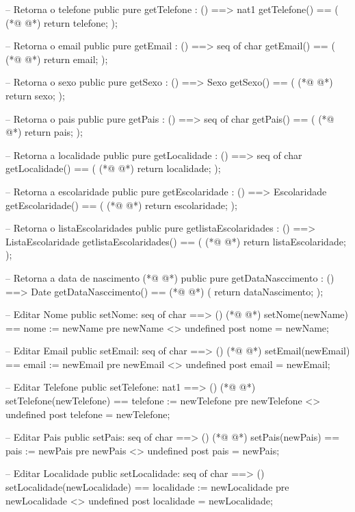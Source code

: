 \begin{vdmpp}[breaklines=true]
 -- Retorna o telefone
 public pure getTelefone : () ==> nat1
 getTelefone() ==
 (
(*@
\label{getEmail:151}
@*)
  return telefone;
 );
 
 -- Retorna o email
 public pure getEmail : () ==> seq of char
 getEmail() ==
 (
(*@
\label{getSexo:158}
@*)
  return email;
 );
 
 -- Retorna o sexo
 public pure getSexo : () ==> Sexo
 getSexo() ==
 (
(*@
\label{getPais:165}
@*)
  return sexo;
 );
 
 -- Retorna o pais
 public pure getPais : () ==> seq of char
 getPais() ==
 (
(*@
\label{getLocalidade:172}
@*)
  return pais;
 );
 
 -- Retorna a localidade
 public pure getLocalidade : () ==> seq of char
 getLocalidade() ==
 (
(*@
\label{getEscolaridade:179}
@*)
  return localidade;
 );
 
 -- Retorna a escolaridade
 public pure getEscolaridade : () ==> Escolaridade
 getEscolaridade() ==
 (
(*@
\label{getlistaEscolaridades:186}
@*)
  return escolaridade;
 );
 
 -- Retorna o listaEscolaridades
 public pure getlistaEscolaridades : () ==> ListaEscolaridade
 getlistaEscolaridades() ==
 (
(*@
\label{setNome:193}
@*)
  return listaEscolaridade;
 );
 
 -- Retorna a data de nascimento
(*@
\label{getDataNasccimento:197}
@*)
 public pure getDataNasccimento : () ==> Date
 getDataNasccimento() ==
(*@
\label{setEmail:199}
@*)
 (
  return dataNascimento;
 );
 
 -- Editar Nome
 public setNome: seq of char ==> ()
(*@
\label{setTelefone:205}
@*)
 setNome(newName) == nome := newName
 pre newName <> undefined
 post nome = newName;
 
 -- Editar Email
 public setEmail: seq of char ==> ()
(*@
\label{setPais:211}
@*)
 setEmail(newEmail) == email := newEmail
 pre newEmail <> undefined
 post email = newEmail;
 
 -- Editar Telefone
 public setTelefone: nat1 ==> ()
(*@
\label{setLocalidade:217}
@*)
 setTelefone(newTelefone) == telefone := newTelefone
 pre newTelefone <> undefined
 post telefone = newTelefone;

 -- Editar Pais
 public setPais: seq of char ==> ()
(*@
\label{setEscolaridade:223}
@*)
 setPais(newPais) == pais := newPais
 pre newPais <> undefined
 post pais = newPais;
 
 -- Editar Localidade
 public setLocalidade: seq of char ==> ()
 setLocalidade(newLocalidade) == localidade := newLocalidade
 pre newLocalidade <> undefined
 post localidade = newLocalidade;
 

\end{vdmpp}
